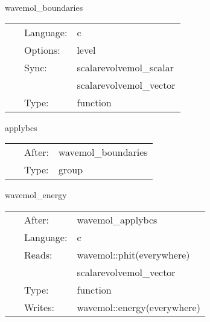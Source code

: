 \vspace{5mm}


\hspace{5mm} wavemol\_boundaries 

\hspace{5mm}{\it register boundary enforcement in mol } 


\hspace{5mm}

 \begin{tabular*}{160mm}{cll} 
~ & Language:  & c \\ 
~ & Options:  & level \\ 
~ & Sync:  & scalarevolvemol\_scalar \\ 
~& ~ &scalarevolvemol\_vector\\ 
~ & Type:  & function \\ 
\end{tabular*} 


\vspace{5mm}


\hspace{5mm} applybcs 

\hspace{5mm}{\it apply boundary conditions for wavemol } 


\hspace{5mm}

 \begin{tabular*}{160mm}{cll} 
~ & After:  & wavemol\_boundaries \\ 
~ & Type:  & group \\ 
\end{tabular*} 


\vspace{5mm}


\hspace{5mm} wavemol\_energy 

\hspace{5mm}{\it calculate the energy } 


\hspace{5mm}

 \begin{tabular*}{160mm}{cll} 
~ & After:  & wavemol\_applybcs \\ 
~ & Language:  & c \\ 
~ & Reads:  & wavemol::phit(everywhere) \\ 
~& ~ &scalarevolvemol\_vector\\ 
~ & Type:  & function \\ 
~ & Writes:  & wavemol::energy(everywhere) \\ 
\end{tabular*} 


